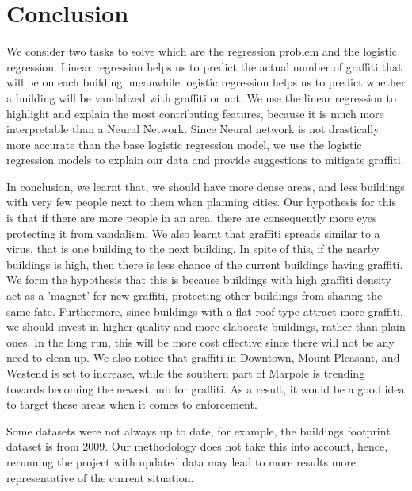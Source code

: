 \chapter{Conclusion}

We consider two tasks to solve which are the regression problem and the logistic regression. Linear regression helps us to predict the actual number of graffiti that will be on each building, meanwhile logistic regression helps us to predict whether a building will be vandalized with graffiti or not. We use the linear regression to highlight and explain the most contributing features, because it is much more interpretable than a Neural Network. Since Neural network is not drastically more accurate than the base logistic regression model, we use the logistic regression models to explain our data and provide suggestions to mitigate graffiti.

In conclusion, we learnt that, we should have more dense areas, and less buildings with very few people next to them when planning cities. Our hypothesis for this is that if there are more people in an area, there are consequently more eyes protecting it from vandalism. We also learnt that graffiti spreads similar to a virus, that is one building to the next building. In spite of this, if the nearby buildings is high, then there is less chance of the current buildings having graffiti. We form the hypothesis that this is because buildings with high graffiti density act as a 'magnet' for new graffiti, protecting other buildings from sharing the same fate. Furthermore, since buildings with a flat roof type attract more graffiti, we should invest in higher quality and more elaborate buildings, rather than plain ones. In the long run, this will be more cost effective since there will not be any need to clean up. We also notice that graffiti in Downtown, Mount Pleasant, and Westend is set to increase, while the southern part of Marpole is trending towards becoming  the newest hub for graffiti. As a result, it would be a good idea to target these areas when it comes to enforcement.

Some datasets were not always up to date, for example, the buildings footprint dataset is from 2009. Our methodology does not take this into account, hence, rerunning the project with updated data may lead to more results more representative of the current situation.


